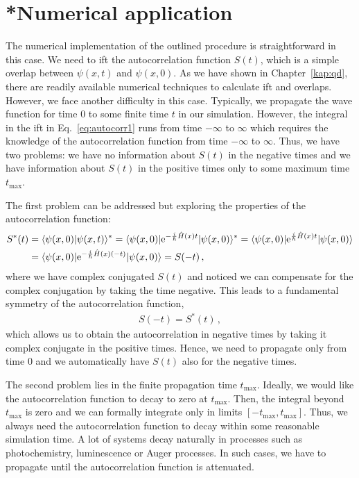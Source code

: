 \section{*Numerical application}

The numerical implementation of the outlined procedure is straightforward in this case. We need to \acrlong{ift} the autocorrelation function $S(t)$, which is a simple overlap between $\psi(x,t)$ and $\psi(x,0)$. As we have shown in Chapter~\ref{kap:qd}, there are readily available numerical techniques to calculate \acrlong{ift} and overlaps. However, we face another difficulty in this case. Typically, we propagate the wave function for time 0 to some finite time $t$ in our simulation. However, the integral in the \acrlong{ift} in Eq.~\eqref{eq:autocorr1} runs from time $-\infty$ to $\infty$ which requires the knowledge of the autocorrelation function from time $-\infty$ to $\infty$. Thus, we have two problems: we have no information about $S(t)$ in the negative times and we have information about $S(t)$ in the positive times only to some maximum time $t_\mathrm{max}$.

The first problem can be addressed but exploring the properties of the autocorrelation function:
\begin{align}
    S^*(t) &= \langle \psi(x,0) | \psi(x,t) \rangle^* = \langle \psi(x,0) | \mathrm{e}^{-\frac{i}{\hbar}\hat{H}(x)t} |\psi(x,0) \rangle^* = \langle \psi(x,0) | \mathrm{e}^{\frac{i}{\hbar}\hat{H}(x)t} |\psi(x,0) \rangle \notag \\
    &= \langle \psi(x,0) | \mathrm{e}^{-\frac{i}{\hbar}\hat{H}(x)(-t)} |\psi(x,0) \rangle = S(-t) \, ,
    \label{eq:autocorrsym2}
\end{align}
where we have complex conjugated $S(t)$ and noticed we can compensate for the complex conjugation by taking the time negative. This leads to a fundamental symmetry of the autocorrelation function,
\begin{align}
    S(-t) = S^*(t) \, ,
    \label{eq:autocorrsym1}
\end{align}
which allows us to obtain the autocorrelation in negative times by taking it complex conjugate in the positive times. Hence, we need to propagate only from time 0 and we automatically have $S(t)$ also for the negative times. 

The second problem lies in the finite propagation time $t_\mathrm{max}$. Ideally, we would like the autocorrelation function to decay to zero at $t_\mathrm{max}$. Then, the integral beyond $t_\mathrm{max}$ is zero and we can formally integrate only in limits $[-t_\mathrm{max}, t_\mathrm{max}]$. Thus, we always need the autocorrelation function to decay within some reasonable simulation time. A lot of systems decay naturally in processes such as photochemistry, luminescence or Auger processes. In such cases, we have to propagate until the autocorrelation function is attenuated.

